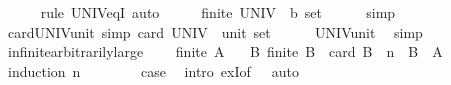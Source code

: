 \begin{isabellebody}
\ \ \ \ \isamarkupfalse%
\ {\isacharparenleft}{\kern0pt}rule\ UNIV{\isacharunderscore}{\kern0pt}eq{\isacharunderscore}{\kern0pt}I{\isacharparenright}{\kern0pt}\ auto\isanewline
\ \ \isamarkupfalse%
\ \isamarkupfalse%
\ {\isachardoublequoteopen}finite\ {\isacharparenleft}{\kern0pt}UNIV\ {\isacharcolon}{\kern0pt}{\isacharcolon}{\kern0pt}\ {\isacharprime}{\kern0pt}b\ set{\isacharparenright}{\kern0pt}{\isachardoublequoteclose}\isanewline
\ \ \ \ \isamarkupfalse%
\ simp\isanewline
{}\isamarkupfalse%
%
\endisatagproof
{\isafoldproof}%
%
\isadelimproof
\isanewline
%
\endisadelimproof
\isanewline
{}\isamarkupfalse%
\ card{\isacharunderscore}{\kern0pt}UNIV{\isacharunderscore}{\kern0pt}unit\ {\isacharbrackleft}{\kern0pt}simp{\isacharbrackright}{\kern0pt}{\isacharcolon}{\kern0pt}\ {\isachardoublequoteopen}card\ {\isacharparenleft}{\kern0pt}UNIV\ {\isacharcolon}{\kern0pt}{\isacharcolon}{\kern0pt}\ unit\ set{\isacharparenright}{\kern0pt}\ {\isacharequal}{\kern0pt}\ {}{\isachardoublequoteclose}\isanewline
%
\isadelimproof
\ \ %
\endisadelimproof
%
\isatagproof
{}\isamarkupfalse%
\ UNIV{\isacharunderscore}{\kern0pt}unit\ \isamarkupfalse%
\ simp%
\endisatagproof
{\isafoldproof}%
%
\isadelimproof
\isanewline
%
\endisadelimproof
\isanewline
{}\isamarkupfalse%
\ infinite{\isacharunderscore}{\kern0pt}arbitrarily{\isacharunderscore}{\kern0pt}large{\isacharcolon}{\kern0pt}\isanewline
\ \ \ {\isachardoublequoteopen}{\isasymnot}\ finite\ A{\isachardoublequoteclose}\isanewline
\ \ \ {\isachardoublequoteopen}{\isasymexists}B{\isachardot}{\kern0pt}\ finite\ B\ {\isasymand}\ card\ B\ {\isacharequal}{\kern0pt}\ n\ {\isasymand}\ B\ {\isasymsubseteq}\ A{\isachardoublequoteclose}\isanewline
%
\isadelimproof
%
\endisadelimproof
%
\isatagproof
{}\isamarkupfalse%
\ {\isacharparenleft}{\kern0pt}induction\ n{\isacharparenright}{\kern0pt}\isanewline
\ \ \isamarkupfalse%
\ {}\isanewline
\ \ \isamarkupfalse%
\ {\isacharquery}{\kern0pt}case\ \isamarkupfalse%
\ {\isacharparenleft}{\kern0pt}intro\ exI{\isacharbrackleft}{\kern0pt}of\ {\isacharunderscore}{\kern0pt}\ {\isachardoublequoteopen}{\isacharbraceleft}{\kern0pt}{\isacharbraceright}{\kern0pt}{\isachardoublequoteclose}{\isacharbrackright}{\kern0pt}{\isacharparenright}{\kern0pt}\ auto\isanewline
{}\isamarkupfalse%
\isanewline
\ \ \isamarkupfalse%

\end{isabellebody}
